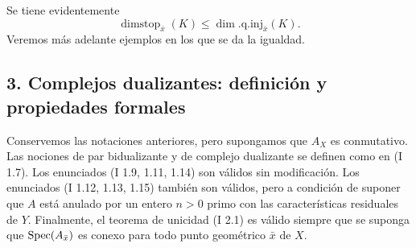 Se tiene evidentemente
\[
        \operatorname{dimstop}_{\bar{x}}(K)\leq \dim.\mathrm{q.inj}_{\bar{x}}(K).
\]
Veremos más adelante ejemplos en los que se da la igualdad.

\subsection*{3. Complejos dualizantes: definición y propiedades formales}

Conservemos las notaciones anteriores, pero supongamos que $A_X$ es conmutativo. Las nociones de par bidualizante y de complejo dualizante se definen como en (I 1.7). Los enunciados (I 1.9, 1.11, 1.14) son válidos sin modificación. Los enunciados (I 1.12, 1.13, 1.15) también son válidos, pero a condición de suponer que $A$ está anulado por un entero $n>0$ primo con las características residuales de $Y$. Finalmente, el teorema de unicidad (I 2.1) es válido siempre que se suponga que $\operatorname{Spec}(A_{\bar{x}})$ es conexo para todo punto geométrico $\bar{x}$ de $X$.

